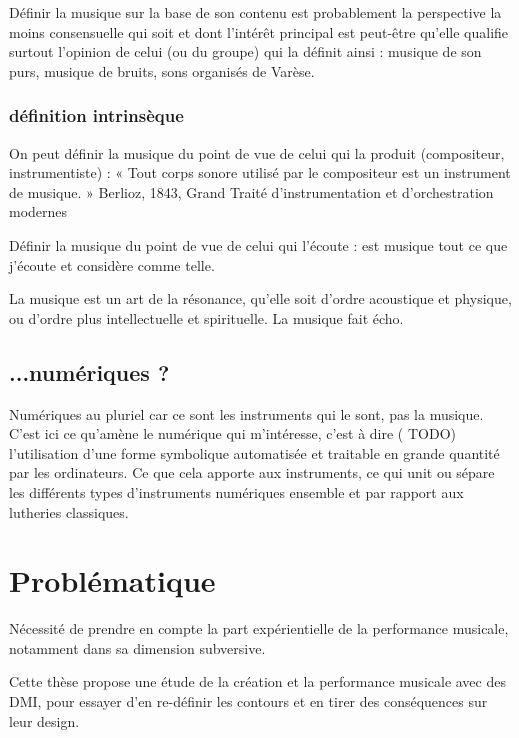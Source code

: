 Définir la musique sur la base de son contenu est probablement la perspective la moins consensuelle qui soit et dont l'intérêt principal est peut-être qu'elle qualifie surtout l'opinion de celui (ou du groupe) qui la définit ainsi : musique de son purs, musique de bruits, sons organisés de Varèse.
\subsubsection*{définition intrinsèque}

On peut définir la musique du point de vue de celui qui la produit (compositeur, instrumentiste) : « Tout corps sonore utilisé par le compositeur est un instrument de musique. » Berlioz, 1843, Grand Traité d'instrumentation et d'orchestration modernes

Définir la musique du point de vue de celui qui l'écoute : est musique tout ce que j'écoute et considère comme telle.

La musique est un art de la résonance, qu'elle soit d'ordre acoustique et physique, ou d'ordre plus intellectuelle et spirituelle. La musique fait écho.

\subsection*{...numériques ?} 
Numériques au pluriel car ce sont les instruments qui le sont, pas la musique.
C'est ici ce qu'amène le numérique qui m'intéresse, c'est à dire ( TODO) l'utilisation d'une forme symbolique automatisée et traitable en grande quantité par les ordinateurs. Ce que cela apporte aux instruments, ce qui unit ou sépare les différents types d'instruments numériques ensemble et par rapport aux lutheries classiques.


\section{Problématique}


Nécessité de prendre en compte la part expérientielle de la performance musicale, notamment dans sa dimension subversive.

Cette thèse propose une étude de la création et la performance musicale avec des \gls{DMI}, pour essayer d'en re-définir les contours et en tirer des conséquences sur leur design.

